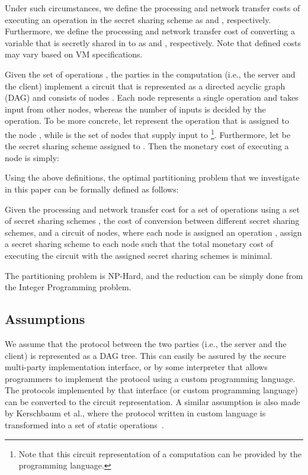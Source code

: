 \documentclass{llncs}
\begin{document}
Under such circumstances, we define the processing and network transfer costs of executing an operation  in the secret sharing scheme  as  and , respectively. Furthermore, we define the processing and network transfer cost of converting a variable that is secretly shared in  to  as  and , respectively. Note that defined costs may vary based on VM specifications. 

Given the set of operations , the parties in the computation (i.e., the server and the client) implement a circuit  that is represented as a directed acyclic graph (DAG) and consists of  nodes . Each node represents a single operation and takes input from other nodes, whereas the number of inputs is decided by the operation. To be more concrete, let  represent the operation that is assigned to the node , while  is the set of nodes that supply input to \footnote{Note that this circuit representation of a computation can be provided by the programming language.}. Furthermore, let  be the secret sharing scheme assigned to . Then the monetary cost of executing a node  is simply:


Using the above definitions, the optimal partitioning problem that we investigate in this paper can be formally defined as follows:

\begin{definition}
	Given the processing and network transfer cost for a set of operations  using a set of secret sharing schemes , the cost of conversion between different secret sharing schemes, and a circuit  of  nodes, where each node  is assigned an operation , assign a secret sharing scheme to each node  such that the total monetary cost of executing the circuit with the assigned secret sharing schemes is minimal.


\end{definition}

The partitioning problem is NP-Hard, and the reduction can be simply done from the Integer Programming problem.

\subsection{Assumptions}
\label{sec:problem:assumptions}

We assume that the protocol between the two parties (i.e., the server and the client) is represented as a DAG tree. This can easily be assured by the secure multi-party implementation interface, or by some interpreter that allows programmers to implement the protocol using a custom programming language. The protocols implemented by that interface (or custom programming language) can be converted to the circuit representation. A similar assumption is also made by Kerschbaum et al., where the protocol written in custom language is transformed into a set of static operations~\cite{cite:kerschbaum2014automatic}. 
\end{document}
